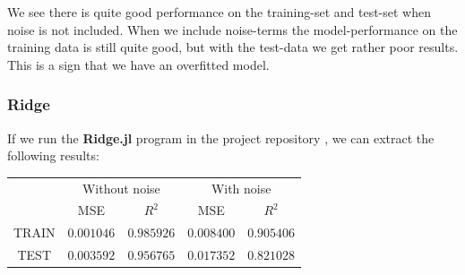\documentclass{article}
\begin{document}
We see there is quite good performance on the training-set and test-set when
noise is not included. When we include noise-terms the model-performance on the
training data is still quite good, but with the test-data we get rather poor
results. This is a sign that we have an overfitted model.

\subsubsection{Ridge}
If we run the \textbf{Ridge.jl} program in the project repository
\cite{githubrepoproject1}, we can extract the following results:\\
\begin{tabular}{| c | c | c | c | c |}
          & \multicolumn{2}{|c|}{Without noise} & \multicolumn{2}{|c|}{With noise}                           \\
          & MSE                                 & $R^2$                            & MSE        & $R^2$      \\
    TRAIN & $0.001046$                          & $0.985926$                       & $0.008400$ & $0.905406$ \\
    TEST  & $0.003592$                          & $0.956765$                       & $0.017352$ & $0.821028$ \\
\end{tabular}
\end{document}
